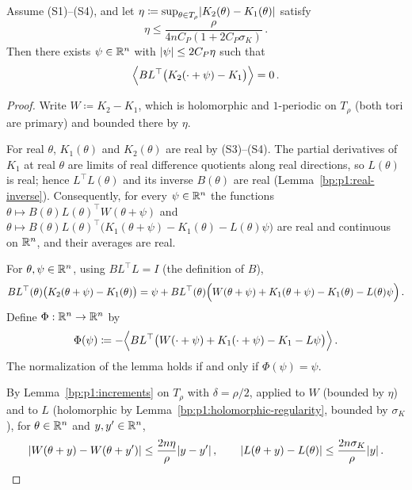 \begin{lemma}\label{bp:p3:phase}
Assume (S1)--(S4), and let $\eta\coloneqq\sup_{\theta\in T_\rho}\lvert K_2(\theta)-K_1(\theta)\rvert$ satisfy
\begin{equation}\label{eq:p3:phase-small}
\eta\le\frac{\rho}{4nC_P(1+2C_P\sigma_K)}\,.
\end{equation}
Then there exists $\psi\in\mathbb{R}^n$ with $\lvert \psi\rvert\le2C_P\eta$ such that
\begin{equation*}
\Bigl\langle BL^\top\bigl(K_2(\cdot+\psi)-K_1\bigr)\Bigr\rangle=0\,.
\end{equation*}
\end{lemma}

\begin{proof}
Write $W\coloneqq K_2-K_1$, which is holomorphic and $1$-periodic on $T_\rho$ (both tori are primary)
and bounded there by $\eta$.

\label{step:p3:phase-real}
For real $\theta$, $K_1(\theta)$ and $K_2(\theta)$ are real by (S3)--(S4). The partial derivatives of
$K_1$ at real $\theta$ are limits of real difference quotients along real directions, so $L(\theta)$ is
real; hence $L^\top L(\theta)$ and its inverse $B(\theta)$ are real (Lemma~\ref{bp:p1:real-inverse}). Consequently, for every
$\psi\in\mathbb{R}^n$ the functions $\theta\mapsto B(\theta)L(\theta)^\top W(\theta+\psi)$ and
$\theta\mapsto B(\theta)L(\theta)^\top\bigl(K_1(\theta+\psi)-K_1(\theta)-L(\theta)\psi\bigr)$ are real
and continuous on $\mathbb{R}^n$, and their averages are real.

\label{step:p3:phase-fixed-point}
For $\theta,\psi\in\mathbb{R}^n$, using $BL^\top L=I$ (the definition of $B$),
\begin{equation*}
BL^\top(\theta)\bigl(K_2(\theta+\psi)-K_1(\theta)\bigr)=\psi+BL^\top(\theta)\Bigl(W(\theta+\psi)
+K_1(\theta+\psi)-K_1(\theta)-L(\theta)\psi\Bigr)\,.
\end{equation*}
Define $\Phi:\mathbb{R}^n\to\mathbb{R}^n$ by
\begin{equation*}
\Phi(\psi)\coloneqq-\Bigl\langle BL^\top\bigl(W(\cdot+\psi)+K_1(\cdot+\psi)-K_1-L\psi\bigr)\Bigr\rangle\,.
\end{equation*}
The normalization of the lemma holds if and only if $\Phi(\psi)=\psi$.

\label{step:p3:phase-derivatives}
By Lemma~\ref{bp:p1:increments} on $T_\rho$ with $\delta=\rho/2$, applied to $W$ (bounded by $\eta$)
and to $L$ (holomorphic by Lemma~\ref{bp:p1:holomorphic-regularity}, bounded by $\sigma_K$), for $\theta\in\mathbb{R}^n$ and $y,y'\in\mathbb{R}^n$,
\begin{equation*}
\lvert W(\theta+y)-W(\theta+y')\rvert\le\frac{2n\eta}{\rho}\lvert y-y'\rvert\,,\qquad
\lvert L(\theta+y)-L(\theta)\rvert\le\frac{2n\sigma_K}{\rho}\lvert y\rvert\,.
\end{equation*}


\end{proof}
